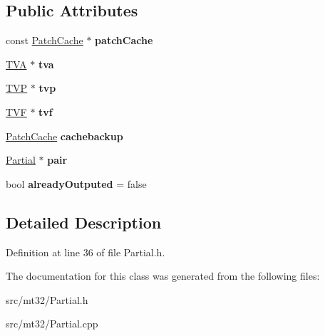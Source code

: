\subsection*{Public Attributes}
\begin{DoxyCompactItemize}
\item 
\hypertarget{classMT32Emu_1_1Partial_a08f0b9690aa5cb80a69b45c9eb9fef45}{const \hyperlink{structMT32Emu_1_1PatchCache}{Patch\-Cache} $\ast$ {\bfseries patch\-Cache}}\label{classMT32Emu_1_1Partial_a08f0b9690aa5cb80a69b45c9eb9fef45}

\item 
\hypertarget{classMT32Emu_1_1Partial_a77861c7710293d7f2e07793e1abc7612}{\hyperlink{classMT32Emu_1_1TVA}{T\-V\-A} $\ast$ {\bfseries tva}}\label{classMT32Emu_1_1Partial_a77861c7710293d7f2e07793e1abc7612}

\item 
\hypertarget{classMT32Emu_1_1Partial_acb800e6656bc33d86db28937d42695ee}{\hyperlink{classMT32Emu_1_1TVP}{T\-V\-P} $\ast$ {\bfseries tvp}}\label{classMT32Emu_1_1Partial_acb800e6656bc33d86db28937d42695ee}

\item 
\hypertarget{classMT32Emu_1_1Partial_aa5bad3e2d2ccce57b595fc304d7e8382}{\hyperlink{classMT32Emu_1_1TVF}{T\-V\-F} $\ast$ {\bfseries tvf}}\label{classMT32Emu_1_1Partial_aa5bad3e2d2ccce57b595fc304d7e8382}

\item 
\hypertarget{classMT32Emu_1_1Partial_a6455991dddfe4281fc2deb8fc676bfe4}{\hyperlink{structMT32Emu_1_1PatchCache}{Patch\-Cache} {\bfseries cachebackup}}\label{classMT32Emu_1_1Partial_a6455991dddfe4281fc2deb8fc676bfe4}

\item 
\hypertarget{classMT32Emu_1_1Partial_aa784f5e14132bf8f9471c6e968db5f5e}{\hyperlink{classMT32Emu_1_1Partial}{Partial} $\ast$ {\bfseries pair}}\label{classMT32Emu_1_1Partial_aa784f5e14132bf8f9471c6e968db5f5e}

\item 
\hypertarget{classMT32Emu_1_1Partial_a3c99c40c88aa9b33aa86a3752fc1977e}{bool {\bfseries already\-Outputed} = false}\label{classMT32Emu_1_1Partial_a3c99c40c88aa9b33aa86a3752fc1977e}

\end{DoxyCompactItemize}


\subsection{Detailed Description}


Definition at line 36 of file Partial.\-h.



The documentation for this class was generated from the following files\-:\begin{DoxyCompactItemize}
\item 
src/mt32/Partial.\-h\item 
src/mt32/Partial.\-cpp\end{DoxyCompactItemize}
